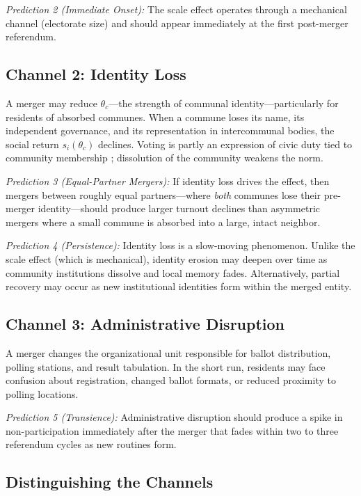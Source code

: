 \documentclass[12pt]{article}
\begin{document}
\textit{Prediction 2 (Immediate Onset):} The scale effect operates through a mechanical channel (electorate size) and should appear immediately at the first post-merger referendum.

\subsection{Channel 2: Identity Loss}

A merger may reduce $\theta_c$---the strength of communal identity---particularly for residents of absorbed communes. When a commune loses its name, its independent governance, and its representation in intercommunal bodies, the social return $s_i(\theta_c)$ declines. Voting is partly an expression of civic duty tied to community membership \citep{dellavigna2017voting, gerber2008social}; dissolution of the community weakens the norm.

\textit{Prediction 3 (Equal-Partner Mergers):} If identity loss drives the effect, then mergers between roughly equal partners---where \textit{both} communes lose their pre-merger identity---should produce larger turnout declines than asymmetric mergers where a small commune is absorbed into a large, intact neighbor.

\textit{Prediction 4 (Persistence):} Identity loss is a slow-moving phenomenon. Unlike the scale effect (which is mechanical), identity erosion may deepen over time as community institutions dissolve and local memory fades. Alternatively, partial recovery may occur as new institutional identities form within the merged entity.

\subsection{Channel 3: Administrative Disruption}

A merger changes the organizational unit responsible for ballot distribution, polling stations, and result tabulation. In the short run, residents may face confusion about registration, changed ballot formats, or reduced proximity to polling locations.

\textit{Prediction 5 (Transience):} Administrative disruption should produce a spike in non-participation immediately after the merger that fades within two to three referendum cycles as new routines form.

\subsection{Distinguishing the Channels}
\end{document}

